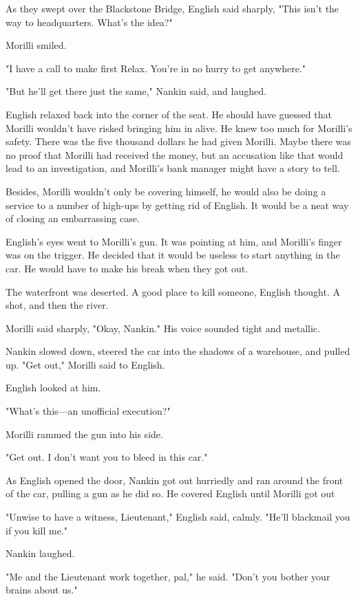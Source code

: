 \documentclass{novel}
\begin{document}
As they swept over the Blackstone Bridge, English said sharply, "This isn't the way to headquarters. What's the idea?"

Morilli smiled.

"I have a call to make first Relax. You're in no hurry to get anywhere."

"But he'll get there just the same," Nankin said, and laughed.

English relaxed back into the corner of the seat. He should have guessed that Morilli wouldn't have risked bringing him in alive. He knew too much for Morilli's safety. There was the five thousand dollars he had given Morilli. Maybe there was no proof that Morilli had received the money, but an accusation like that would lead to an investigation, and Morilli's bank manager might have a story to tell.

Besides, Morilli wouldn't only be covering himself, he would also be doing a service to a number of high-ups by getting rid of English. It would be a neat way of closing an embarrassing case.

English's eyes went to Morilli's gun. It was pointing at him, and Morilli's finger was on the trigger. He decided that it would be useless to start anything in the car. He would have to make his break when they got out.

The waterfront was deserted. A good place to kill someone, English thought. A shot, and then the river.

Morilli said sharply, "Okay, Nankin." His voice sounded tight and metallic.

Nankin slowed down, steered the car into the shadows of a warehouse, and pulled up. "Get out," Morilli said to English.

English looked at him.

"What's this—an unofficial execution?"

Morilli rammed the gun into his side.

"Get out. I don't want you to bleed in this car."

As English opened the door, Nankin got out hurriedly and ran around the front of the car, pulling a gun as he did so. He covered English until Morilli got out

"Unwise to have a witness, Lieutenant," English said, calmly. "He'll blackmail you if you kill me."

Nankin laughed.

"Me and the Lieutenant work together, pal," he said. "Don't you bother your brains about us."
\end{document}
